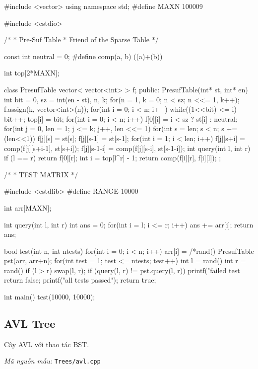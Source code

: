 \documentclass[11pt]{article}
\newcommand{\codepath}[1]{\par\noindent\textit{Mã nguồn mẫu:} \texttt{#1}\par}
\begin{document}
\begingroup\scriptsize
\begin{vncode}
#include <vector>
using namespace std;
#define MAXN 100009

#include <cstdio>

/*
 * Pre-Suf Table
 * Friend of the Sparse Table
 */

const int neutral = 0;
#define comp(a, b) ((a)+(b))

int top[2*MAXN];

class PresufTable {
	vector< vector<int> > f;
public:
	PresufTable(int* st, int* en) {
		int bit = 0, sz = int(en - st), n, k;
		for(n = 1, k = 0; n < sz; n <<= 1, k++);
		f.assign(k, vector<int>(n));
		for(int i = 0; i < n; i++) {
			while((1<<bit) <= i) bit++;
			top[i] = bit;
		}
		for(int i = 0; i < n; i++)
			f[0][i] = i < sz ? st[i] : neutral;
		for(int j = 0, len = 1; j <= k; j++, len <<= 1)
			for(int s = len; s < n; s += (len<<1)) {
				f[j][s] = st[s]; f[j][s-1] = st[s-1];
				for(int i = 1; i < len; i++) {
					f[j][s+i] = comp(f[j][s+i-1], st[s+i]);
					f[j][s-1-i] = comp(f[j][s-i], st[s-1-i]);
				}
			}
	}
	int query(int l, int r) {
		if (l == r) return f[0][r];
		int i = top[l^r] - 1;
		return comp(f[i][r], f[i][l]);
	}
};

/*
 * TEST MATRIX
 */

#include <cstdlib>
#define RANGE 10000

int arr[MAXN];

int query(int l, int r) {
	int ans = 0;
	for(int i = l; i <= r; i++) {
		ans += arr[i];
	}
	return ans;
}

bool test(int n, int ntests) {
	for(int i = 0; i < n; i++) arr[i] = /*rand()%
	PresufTable pst(arr, arr+n);
	for(int test = 1; test <= ntests; test++) {
		int l = rand()%
		int r = rand()%
		if (l > r) swap(l, r);
		if (query(l, r) != pst.query(l, r)) {
			printf("failed test %
			return false;
		}
	}
	printf("all tests passed\n");
	return true;
}

int main() {
	test(10000, 10000);
}
\end{vncode}
\endgroup


\subsection{AVL Tree}

Cây AVL với thao tác BST.

\codepath{Trees/avl.cpp}
\end{document}
